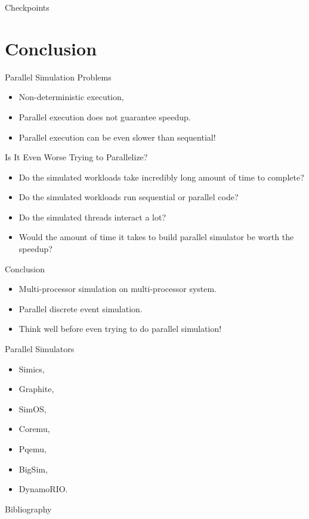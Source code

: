 \begin{frame}{Checkpoints}
  \centering
\end{frame}

\section*{Conclusion}

\begin{frame}{Parallel Simulation Problems}
  \begin{itemize}
    \item Non-deterministic execution,
    \item Parallel execution does not guarantee speedup. \pause
    \item Parallel execution can be even slower than sequential!
  \end{itemize}
\end{frame}

\begin{frame}{Is It Even Worse Trying to Parallelize?}
  \begin{itemize}
    \item Do the simulated workloads take incredibly long amount of time to
      complete?
    \item Do the simulated workloads run sequential or parallel code?
    \item Do the simulated threads interact a lot? \pause
    \item Would the amount of time it takes to build parallel simulator be
      worth the speedup?
  \end{itemize}
\end{frame}

\begin{frame}{Conclusion}
  \begin{itemize}
    \item Multi-processor simulation on multi-processor system.
    \item Parallel discrete event simulation. \pause
    \item Think well before even trying to do parallel simulation!
  \end{itemize}
\end{frame}

\begin{frame}{Parallel Simulators}
  \begin{itemize}
    \item Simics,
    \item Graphite,
    \item SimOS,
    \item Coremu,
    \item Pqemu,
    \item BigSim,
    \item DynamoRIO.
  \end{itemize}
\end{frame}

\begin{frame}[allowframebreaks]{Bibliography}
  \nocite{gharachorloo-memory-consistency}
  \nocite{ding-pqemu}
  \nocite{fujimoto-pdes}
  \nocite{liu-pdes}
  \nocite{misra-ddes}
  \printbibliography
\end{frame}

\finalslide



